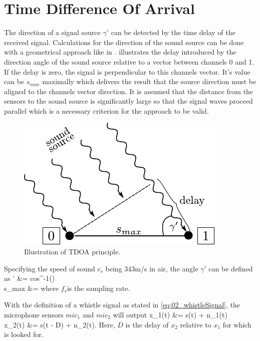 \section{Time Difference Of Arrival}
\label{sec:02_tdoa}

The direction of a signal source $\gamma'$ can be detected by the time delay of
the received signal.
Calculations for the direction of the sound source can be done with a
geometrical approach like in \cite{Valin_Michaud}.
 illustrates the delay introduced by the direction angle
of the sound source relative to a vector between channels 0 and 1.
If the delay is zero, the signal is perpendicular to this channels vector.
It's value can be $s_{max}$ maximally which delivers the result that the source
direction must be aligned to the channels vector direction.
It is assumed that the distance from the sensors to the sound source is
significantly large so that the signal waves proceed parallel which is a necessary
criterion for the approach to be valid.
\begin{figure}[ht]
	\centering
		\includegraphics[width=0.4\columnwidth]{figures/tdoa_waves}
	\caption{Illustration of TDOA principle.}
    \label{fig:02_tdoa}
\end{figure}

Specifying the speed of sound $c_s$ being 343\si{m/s} in air, the angle
$\gamma'$ can be defined as
\bsub \bal
    \gamma' &= cos^{-1}()
    \label{eq:02_tdoaAngle}\\
    s_{max} &= 
\eal \esub
where $f_s$is the sampling rate.

With the definition of a whistle signal as stated in \cref{eq:02_whistleSignal},
the microphone sensors $mic_1$ and $mic_2$ will output
\bsub \bal
    x_1(t) &= s(t) + n_1(t)\\
    x_2(t) &= \alpha s(t - D) + n_2(t).
\eal \esub
\label{eq:02_signalTimeDomain}
Here, $D$ is the delay of $x_2$ relative to $x_1$ for which is looked for.